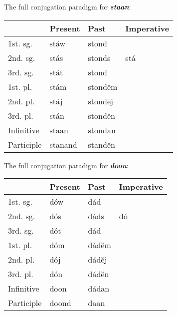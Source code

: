 The full conjugation paradigm for \textbf{\emph{staan}}:

\begin{center}
\begin{tabular}{llll}
& Present & Past & Imperative \\
\hline
1st. sg. & stáw & stond   & \\
2nd. sg. & stás & stonds  & stá \\
3rd. sg. & stát & stond   & \\
1st. pl. & stám & stondĕm & \\
2nd. pl. & stáj & stondĕj & \\
3rd. pl. & stán & stondĕn & \\
\hline
Infinitive & staan & stondan \\
Participle & stanand & standĕn \\
\end{tabular}    
\end{center}

The full conjugation paradigm for \textbf{\emph{doon}}:

\begin{center}
\begin{tabular}{llll}
& Present & Past & Imperative \\
\hline
1st. sg. & dów & dád  & \\
2nd. sg. & dós & dáds & dó \\
3rd. sg. & dót & dád  & \\
1st. pl. & dóm & dádĕm & \\
2nd. pl. & dój & dádĕj & \\
3rd. pl. & dón & dádĕn & \\
\hline
Infinitive & doon & dádan \\
Participle & doond & daan \\
\end{tabular}    
\end{center}
